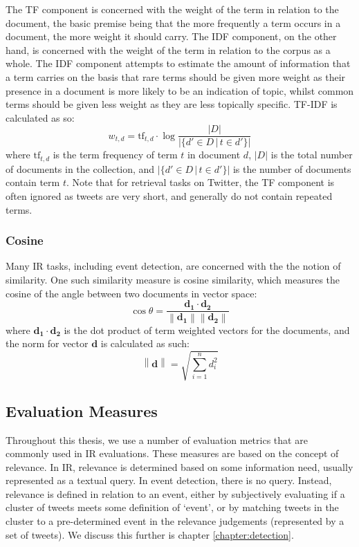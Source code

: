 The TF component is concerned with the weight of the term in relation to the document, the basic premise being that the more frequently a term occurs in a document, the more weight it should carry.
The IDF component, on the other hand, is concerned with the weight of the term in relation to the corpus as a whole.
The IDF component attempts to estimate the amount of information that a term carries on the basis that rare terms should be given more weight as their presence in a document is more likely to be an indication of topic, whilst common terms should be given less weight as they are less topically specific.
TF-IDF is calculated as so:
\begin{equation}
	w_{t,d} = \mathrm{tf}_{t,d} \cdot \log{\frac{|D|}{|\{d' \in D \, | \, t \in d'\}|}}
\end{equation}
where \(\mathrm{tf}_{t,d}\) is the term frequency of term \(t\) in document \(d\), \(|D|\) is the total number of documents in the collection, and \(|\{d' \in D \, | \, t \in d'\}|\) is the number of documents contain term \(t\).
Note that for retrieval tasks on Twitter, the TF component is often ignored as tweets are very short, and generally do not contain repeated terms.

\subsubsection{Cosine}

Many IR tasks, including event detection, are concerned with the the notion of similarity.
One such similarity measure is cosine similarity, which measures the cosine of the angle between two documents in vector space:
\begin{equation}
	\cos{\theta} = \frac{\mathbf{d_1} \cdot \mathbf{d_2}}{\left\| \mathbf{d_1} \right\| \left \| \mathbf{d_2} \right\|}
\end{equation}
where \(\mathbf{d_1} \cdot \mathbf{d_2}\) is the dot product of term weighted vectors for the documents, and the norm for vector \(\mathbf{d}\) is calculated as such:
\begin{equation}
	\left\| \mathbf{d} \right\| = \sqrt{\sum_{i=1}^n d_i^2}
\end{equation}

\subsection{Evaluation Measures}
Throughout this thesis, we use a number of evaluation metrics that are commonly used in IR evaluations.
These measures are based on the concept of relevance.
In IR, relevance is determined based on some information need, usually represented as a textual query.
In event detection, there is no query.
Instead, relevance is defined in relation to an event, either by subjectively evaluating if a cluster of tweets meets some definition of `event', or by matching tweets in the cluster to a pre-determined event in the relevance judgements (represented by a set of tweets).
We discuss this further is chapter \ref{chapter:detection}.

